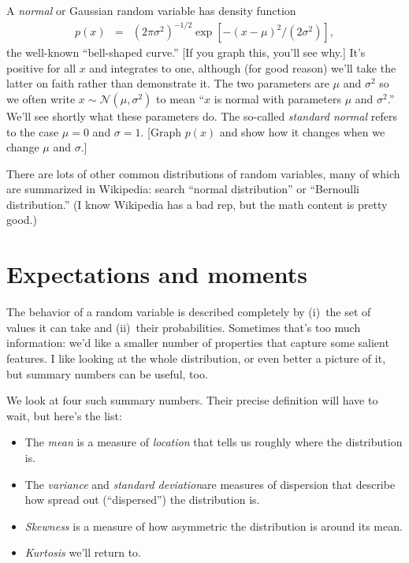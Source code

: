 \documentclass[11pt]{article}
\begin{document}
\begin{itemize}
A {\it normal\/} or Gaussian random variable has density
function
\begin{eqnarray*}
    p(x) &=& (2 \pi \sigma^2)^{-1/2} \exp[-(x-\mu)^2/(2\sigma^2)] ,
\end{eqnarray*}
the well-known ``bell-shaped curve.''
[If you graph this, you'll see why.]
It's positive for all $x$ and integrates to one,
although (for good reason) we'll take the latter on faith rather than demonstrate it.
%
The two parameters are $\mu$ and $\sigma^2$ so we often
write $ x \sim \mathcal{N}(\mu, \sigma^2)$ to mean
``$x$ is normal with parameters $\mu$ and $\sigma^2$.''
We'll see shortly what these parameters do.
%
The so-called {\it standard normal\/} refers to the case
$\mu = 0$ and $\sigma = 1$.
[Graph $p(x)$ and show how it changes when we change $\mu$ and $\sigma$.]
\end{itemize}

There are lots of other common distributions of random variables,
many of which are summarized in Wikipedia:
search ``normal distribution'' or ``Bernoulli distribution.''
(I know Wikipedia
has a bad rep, but the math content is pretty good.)


\section{Expectations and moments}

The behavior of a random variable is described completely
by (i)~the set of values it can take
and (ii)~their probabilities.
Sometimes that's too much information:  we'd like a smaller number
of properties that capture some salient features.
I like looking at the whole distribution,
or even better a picture of it,
but summary numbers can be useful, too.

We look at four such summary numbers.  Their precise definition will have to wait,
but here's the list:
\begin{itemize}
\item The {\it mean\/} is a measure of {\it location\/} that tells us roughly where the
distribution is.
\item The {\it variance\/} and {\it standard deviation\/}are
measures of dispersion that describe how spread out (``dispersed'') the distribution is.
\item {\it Skewness\/} is a measure of how asymmetric the distribution is around its mean.
\item {\it Kurtosis\/} we'll return to.
\end{itemize}
\end{document}
